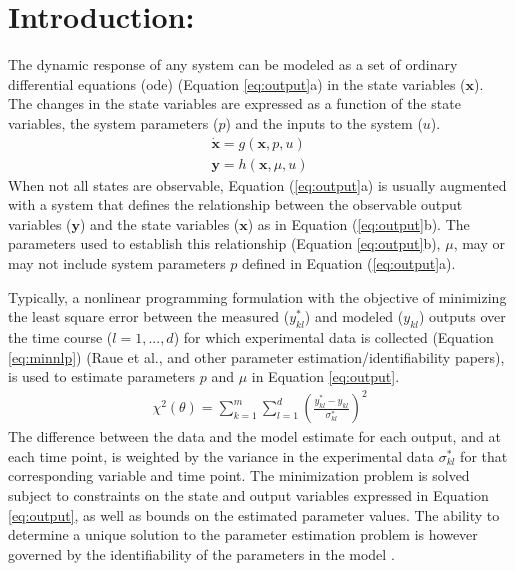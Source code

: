 \documentclass[10pt]{article}
\begin{document}
\section{Introduction:}	
The dynamic response of any system can be modeled as a set of ordinary differential equations (ode) (Equation \ref{eq:output}a) in the state variables ($\mathbf{x}$). The changes in the state variables are expressed as a function of the state variables, the system parameters ($p$) and the inputs to the system ($u$).	
\begin{subequations}\label{eq:output}
	\begin{align}
	\dot{\mathbf{x}} = g(\mathbf{x}, p, u)\\
	\mathbf{y} = h(\mathbf{x},\mu,u)
	\end{align}
\end{subequations}
When not all states are observable, Equation (\ref{eq:output}a) is usually augmented with a system that defines the relationship between the observable output variables ($\mathbf{y}$) and the state variables ($\mathbf{x}$) as in Equation (\ref{eq:output}b). The parameters used to establish this relationship (Equation \ref{eq:output}b), $\mu$, may or may not include system parameters $p$ defined in Equation (\ref{eq:output}a).

Typically, a nonlinear programming formulation with the objective of minimizing the least square error between the measured ($y_{kl}^*$) and modeled ($y_{kl}$) outputs over the time course ($l = {1, ..., d}$) for which experimental data is collected (Equation \ref{eq:minnlp}) (Raue et al., and other parameter estimation/identifiability papers), is used to estimate parameters $p$ and $\mu$ in Equation \ref{eq:output}.
\begin{align}\label{eq:minnlp}
\chi^2(\theta) = \sum_{k=1}^{m}\sum_{l=1}^{d}\left(\frac{y_{kl}^*-y_{kl}}{\sigma_{kl}^*}\right)^2
\end{align}
The difference between the data and the model estimate for each output, and at each time point, is weighted by the variance in the experimental data $\sigma_{kl}^*$ for that corresponding variable and time point.
The minimization problem is solved subject to constraints on the state and output variables expressed in Equation \ref{eq:output}, as well as bounds on the estimated parameter values. The ability to determine a unique solution to the parameter estimation problem is however governed by the identifiability of the parameters in the model \parencite{McLean2012}. 
\end{document}
